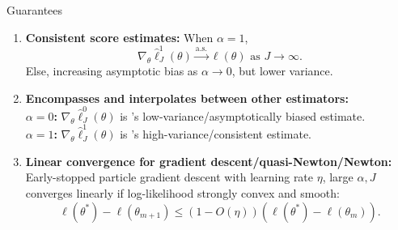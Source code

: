 \documentclass[final]{beamer}
\newlength{\colwidth}
\begin{document}
\begin{frame}[t]
\begin{columns}[t]
\begin{column}{\colwidth}
\begin{alertblock}{Guarantees}
\begin{enumerate}
  \item \textbf{Consistent score estimates:} When $\alpha=1$, $$\nabla_\theta \hat\ell_J^1(\theta) \stackrel{\text{a.s.}}{\to} \ell(\theta) \text{ as } J \to \infty.$$ Else, increasing asymptotic bias as $\alpha \to 0$, but lower variance.
  \vspace{2ex}
  \item \textbf{Encompasses and interpolates between other estimators:}\\
  \textbf{$\alpha=0$:} $\nabla_\theta \hat\ell_J^0(\theta)$ is \cite{naesseth18}'s low-variance/asymptotically biased estimate. \\
  \textbf{$\alpha=1$:} $\nabla_\theta \hat\ell_J^1(\theta)$ is \cite{poyiadjis11}'s high-variance/consistent estimate.
  \vspace{2ex}
  \item \textbf{Linear convergence for gradient descent/quasi-Newton/Newton:} \\Early-stopped particle gradient descent with learning rate $\eta$, large $\alpha, J$ converges linearly if log-likelihood strongly convex and smooth:
  $$\ell\left(\theta^*\right)-\ell\left(\theta_{m+1}\right) \leq\left(1- O(\eta)\right)\left(\ell\left(\theta^*\right)-\ell\left(\theta_m\right)\right).$$
    \end{enumerate}
  \end{alertblock}


\end{column}
\end{columns}
\end{frame}
\end{document}
